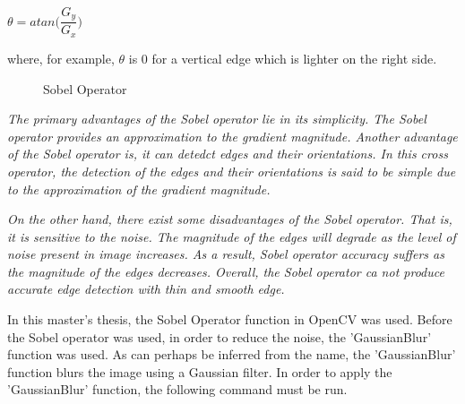 \begin{center}
$\theta = atan\bigg(\dfrac{G_{y}}{G_{x}}\bigg)$
\end{center}

where, for example, $\theta$ is 0 for a vertical edge which is lighter on the right side.\cite{Sobel_Operator}


\begin{figure}[H]
  \centering
  \hfill
  \caption{Sobel Operator\cite{Sobel_Operator}}
\end{figure} 


\emph{\color{red}The primary advantages of the Sobel operator lie in its simplicity. The Sobel operator provides an approximation to the gradient magnitude. Another advantage of the Sobel operator is, it can detedct edges and their orientations. In this cross operator, the detection of the edges and their orientations is said to be simple due to the approximation of the gradient magnitude.} 

\emph{\color{red}On the other hand, there exist some disadvantages of the Sobel operator. That is, it is sensitive to the noise. The magnitude of the edges will degrade as the level of noise present in image increases. As a result, Sobel operator accuracy suffers as the magnitude of the edges decreases. Overall, the Sobel operator ca not produce accurate edge detection with thin and smooth edge.}



In this master's thesis, the Sobel Operator function in OpenCV was used. Before the Sobel operator was used, in order to reduce the noise, the 'GaussianBlur' function was used. As can perhaps be inferred from the name, the 'GaussianBlur' function blurs the image using a Gaussian filter. In order to apply the 'GaussianBlur' function, the following command must be run.

